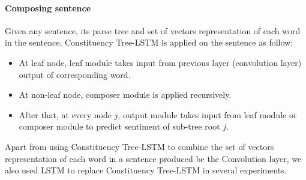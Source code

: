 \paragraph{Composing sentence}
Given any sentence, its parse tree and set of vectors representation of each word in the sentence, Constituency Tree-LSTM is applied on the sentence as follow:
\begin{itemize}
  \item At leaf node, leaf module takes input from previous layer (convolution layer) output of corresponding word.
  \item At non-leaf node, composer module is applied recursively.
  \item After that, at every node \({j}\), output module takes input from leaf module or composer module to predict sentiment of sub-tree root \({j}\).
\end{itemize}

Apart from using Constituency Tree-LSTM to combine the set of vectors representation of each word in a sentence produced be the Convolution layer, we also used LSTM to replace Constituency Tree-LSTM in several experiments.


